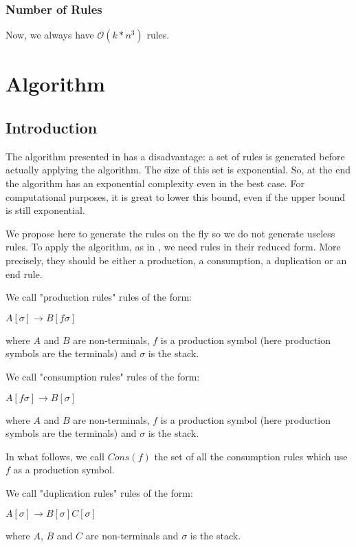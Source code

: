 \documentclass[10pt,a4paper,draft]{article}
\begin{document}
\subsubsection{Number of Rules}

Now, we always have $\mathcal{O}(k * n^3)$ rules.

\section{Algorithm}

\subsection{Introduction}
\label{introAlgo}

The algorithm presented in \cite{aho68} has a disadvantage: a set of rules is generated before actually applying the algorithm. The size of this set is exponential. So, at the end the algorithm has an exponential complexity even in the best case. For computational purposes, it is great to lower this bound, even if the upper bound is still exponential.

We propose here to generate the rules on the fly so we do not generate useless rules. To apply the algorithm, as in \cite{aho68}, we need rules in their reduced form. More precisely, they should be either a production, a consumption, a duplication or an end rule.

\begin{definition}
We call "production rules" rules of the form:

$A[\sigma] \rightarrow B[f \sigma]$

where $A$ and $B$ are non-terminals, $f$ is a production symbol (here production symbols are the terminals) and $\sigma$ is the stack.
\end{definition}

\begin{definition}
We call "consumption rules" rules of the form:

$A[f \sigma] \rightarrow B[\sigma]$

where $A$ and $B$ are non-terminals, $f$ is a production symbol (here production symbols are the terminals) and $\sigma$ is the stack.

In what follows, we call $Cons(f)$ the set of all the consumption rules which use $f$ as a production symbol.
\end{definition}

\begin{definition}
We call "duplication rules" rules of the form:

$A[\sigma] \rightarrow B[\sigma] C[\sigma]$

where $A$, $B$ and $C$ are non-terminals and $\sigma$ is the stack.
\end{definition}
\end{document}
